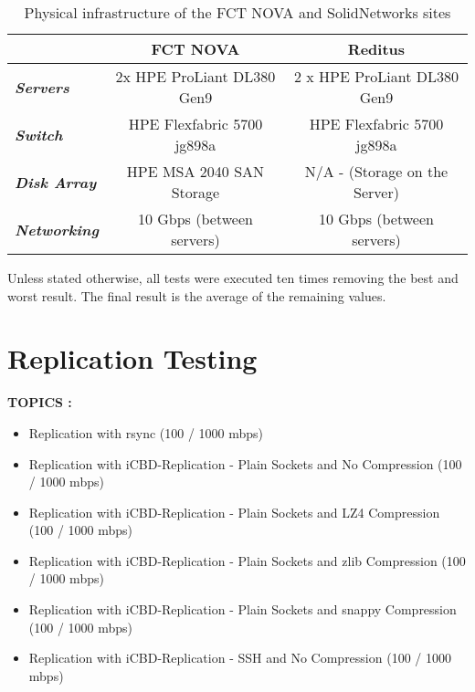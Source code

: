 \begin{table}[htpb]
\centering
\begin{tabular}{lcc}
\hline
                             & \textbf{FCT NOVA}          & \textbf{Reditus}              \\ \hline
\textit{\textbf{Servers}}    & 2x HPE ProLiant DL380 Gen9 & 2 x HPE ProLiant DL380 Gen9   \\
\textit{\textbf{Switch}}     & HPE Flexfabric 5700 jg898a & HPE Flexfabric 5700 jg898a    \\
\textit{\textbf{Disk Array}} & HPE MSA 2040 SAN Storage   & N/A - (Storage on the Server) \\
\textit{\textbf{Networking}} & 10 Gbps (between servers)  & 10 Gbps (between servers)     \\ \hline
\end{tabular}
\caption{Physical infrastructure of the FCT NOVA and SolidNetworks sites}
\end{table}


Unless stated otherwise, all tests were executed ten times removing the best and worst result. The final result is the average of the remaining values. 

\section{Replication Testing}
\label{sec:eval_rep_functional_testing}

\textbf{TOPICS :}
\begin{itemize}
	\item Replication with rsync (100 / 1000 mbps)
	\item Replication with iCBD-Replication - Plain Sockets and No Compression (100 / 1000 mbps)
	\item Replication with iCBD-Replication - Plain Sockets and LZ4 Compression (100 / 1000 mbps)
	\item Replication with iCBD-Replication - Plain Sockets and zlib Compression (100 / 1000 mbps)
	\item Replication with iCBD-Replication - Plain Sockets and snappy Compression (100 / 1000 mbps)
	\item Replication with iCBD-Replication - SSH and No Compression (100 / 1000 mbps)
\end{itemize}

